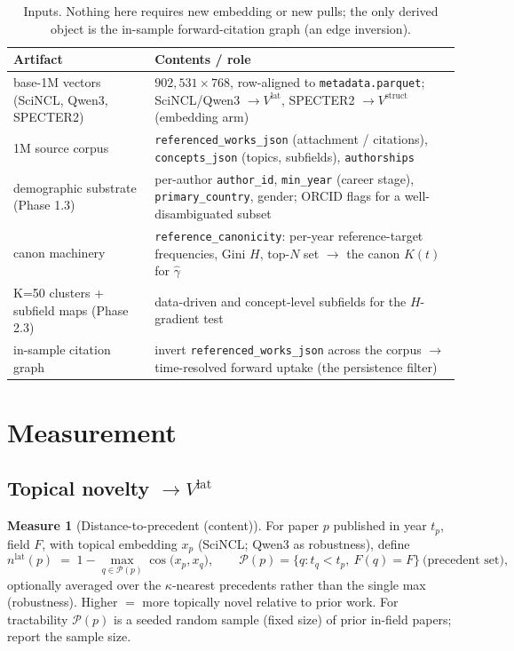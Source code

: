 \documentclass[11pt,letterpaper]{article}
\theoremstyle{definition}
\newtheorem{measure}{Measure}
\theoremstyle{plain}
\newcommand{\Vstruct}{V^{\mathrm{struct}}}
\newcommand{\Vlat}{V^{\mathrm{lat}}}
\begin{document}
\begin{table}[h]
\centering
\small
\begin{tabularx}{\textwidth}{@{}lX@{}}
\toprule
Artifact & Contents / role \\
\midrule
base-1M vectors (SciNCL, Qwen3, SPECTER2) & $902{,}531\times768$, row-aligned to
\texttt{metadata.parquet}; SciNCL/Qwen3 $\to\Vlat$, SPECTER2 $\to\Vstruct$
(embedding arm) \\
1M source corpus & \texttt{referenced\_works\_json} (attachment / citations),
\texttt{concepts\_json} (topics, subfields), \texttt{authorships} \\
demographic substrate (Phase 1.3) & per-author \texttt{author\_id},
\texttt{min\_year} (career stage), \texttt{primary\_country}, gender; ORCID flags
for a well-disambiguated subset \\
canon machinery & \texttt{reference\_canonicity}: per-year reference-target
frequencies, Gini $H$, top-$N$ set $\to$ the canon $K(t)$ for $\hat\gamma$ \\
K=50 clusters + subfield maps (Phase 2.3) & data-driven and concept-level
subfields for the $H$-gradient test \\
in-sample citation graph & invert \texttt{referenced\_works\_json} across the
corpus $\to$ time-resolved forward uptake (the persistence filter) \\
\bottomrule
\end{tabularx}
\caption{Inputs. Nothing here requires new embedding or new pulls; the only
derived object is the in-sample forward-citation graph (an edge inversion).}
\label{tab:inputs}
\end{table}

\section{Measurement}

\subsection{Topical novelty $\to \Vlat$}\label{sec:lat}

\begin{measure}[Distance-to-precedent (content)]\label{meas:lat}
For paper $p$ published in year $t_p$, field $F$, with topical embedding
$x_p$ (SciNCL; Qwen3 as robustness), define
\begin{equation}
  n^{\mathrm{lat}}(p) \;=\; 1 - \max_{q\in\mathcal{P}(p)} \cos\!\big(x_p, x_q\big),
  \qquad
  \mathcal{P}(p) = \{q : t_q < t_p,\ F(q)=F\}\ \text{(precedent set)},
\end{equation}
optionally averaged over the $\kappa$-nearest precedents rather than the single
max (robustness). Higher $=$ more topically novel relative to prior work. For
tractability $\mathcal{P}(p)$ is a seeded random sample (fixed size) of prior
in-field papers; report the sample size.
\end{measure}
\end{document}
